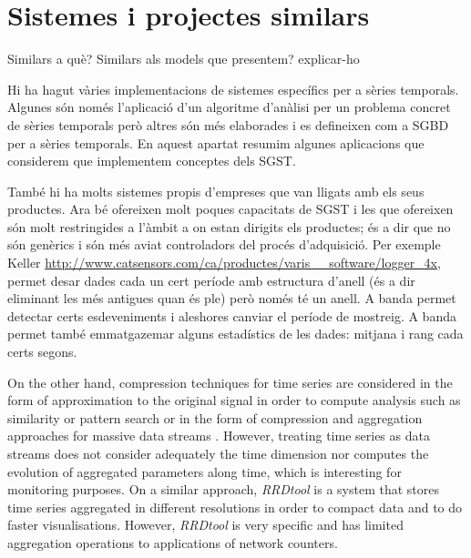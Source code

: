 
\section{Sistemes i projectes similars}




Similars a què? Similars als models que presentem? explicar-ho


Hi ha hagut vàries implementacions de sistemes específics per a sèries
temporals. Algunes són només l'aplicació d'un algoritme d'anàlisi per
un problema concret de sèries temporals però altres són més elaborades
i es defineixen com a SGBD per a sèries temporals.  En aquest apartat
resumim algunes aplicacions que considerem que implementem conceptes
dels SGST.







\todo{} També hi ha molts sistemes propis d'empreses que van lligats
amb els seus productes. Ara bé ofereixen molt poques capacitats de
SGST i les que ofereixen són molt restringides a l'àmbit a on estan
dirigits els productes; és a dir que no són genèrics i són més aviat
controladors del procés d'adquisició. Per exemple Keller
\url{http://www.catsensors.com/ca/productes/varis__software/logger_4x}, permet desar dades cada un cert període amb estructura d'anell (és a dir eliminant les més antigues quan és ple) però només té un anell. A banda permet detectar certs esdeveniments i aleshores canviar el període de mostreig. A banda permet també emmatgazemar alguns estadístics de les dades: mitjana i rang cada certs segons.






On the other hand, compression techniques for time series are
considered in the form of approximation to the original signal in
order to compute analysis such as similarity or pattern search
\cite{fu11,keogh01,last01} or in the form of compression and
aggregation approaches for massive data streams
\cite{cormode08:pods,bonnet01}. However, treating time series as data
streams does not consider adequately the time dimension nor computes
the evolution of aggregated parameters along time, which is
interesting for monitoring purposes.  On a similar approach,
\emph{RRDtool} \cite{rrdtool} is a system that stores time series
aggregated in different resolutions in order to compact data and to do
faster visualisations. However, \emph{RRDtool} is very specific and
has limited aggregation operations to applications of network
counters.


